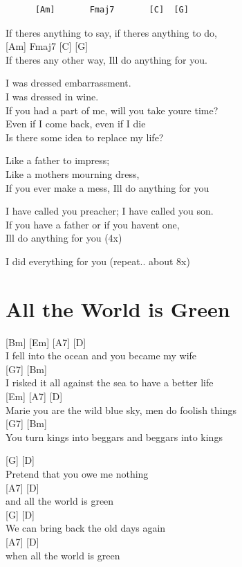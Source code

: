 \documentclass[
  letterpaper,
]{scrbook}
\begin{document}
\begin{verbatim}
      [Am]       Fmaj7       [C]  [G]
\end{verbatim}

If there\textquotesingle s anything to say, if there\textquotesingle s
anything to do,\\
{[}Am{]} Fmaj7 {[}C{]} {[}G{]}\\
If there\textquotesingle s any other way, I\textquotesingle ll do
anything for you.

I was dressed embarrassment.\\
I was dressed in wine.\\
If you had a part of me, will you take you\textquotesingle re time?\\
Even if I come back, even if I die\\
Is there some idea to replace my life?

Like a father to impress;\\
Like a mother\textquotesingle s mourning dress,\\
If you ever make a mess, I\textquotesingle ll do anything for you

I have called you preacher; I have called you son.\\
If you have a father or if you haven\textquotesingle t one,\\
I\textquotesingle ll do anything for you (4x)

I did everything for you (repeat.. about 8x)

\hypertarget{all-the-world-is-green}{%
\chapter{All the World is Green}\label{all-the-world-is-green}}

{[}Bm{]} {[}Em{]} {[}A7{]} {[}D{]}\\
I fell into the ocean and you became my wife\\
{[}G7{]} {[}Bm{]}\\
I risked it all against the sea to have a better life\\
{[}Em{]} {[}A7{]} {[}D{]}\\
Marie you are the wild blue sky, men do foolish things\\
{[}G7{]} {[}Bm{]}\\
You turn kings into beggars and beggars into kings

{[}G{]} {[}D{]}\\
Pretend that you owe me nothing\\
{[}A7{]} {[}D{]}\\
and all the world is green\\
{[}G{]} {[}D{]}\\
We can bring back the old days again\\
{[}A7{]} {[}D{]}\\
when all the world is green
\end{document}
